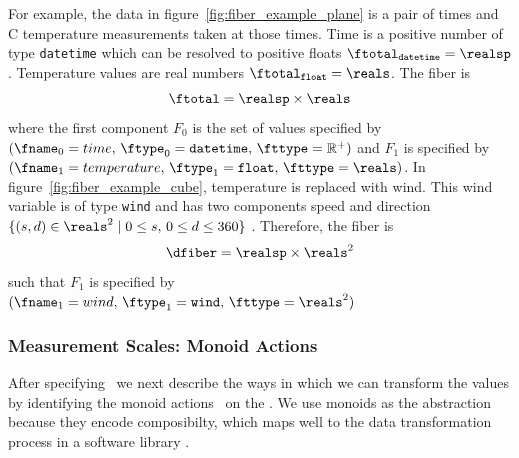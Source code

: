 \documentclass[../main.tex]{subfiles}
\begin{document}
For example, the data in figure~\ref{fig:fiber_example_plane} is a pair of times and \textdegree C temperature measurements taken at those times. Time is a positive number of type \texttt{datetime} which can be resolved to positive floats $\ftotal_{\texttt{datetime}}= \realsp$. Temperature values are real numbers $\ftotal_{\texttt{float}} = \reals$. The fiber is 
\begin{equation}
    \ftotal =  \realsp \times \reals 
\end{equation} 
where the first component $F_0$ is the set of values specified by $(\fname_0=time,\, \ftype_0=\texttt{datetime},\, \fttype=\mathbb{R}^+)$ and $F_1$ is specified by $(\fname_1=temperature,\, \ftype_1=\texttt{float},\, \fttype=\reals)$. In figure~\ref{fig:fiber_example_cube}, temperature is replaced with wind. This wind variable is of type \texttt{wind} and has two components speed and direction $\{(s,d) \in \reals^{2} \mid  0\leq s,\, 0 \leq d \leq 360\}$ . Therefore, the fiber is 
\begin{equation}
    \dfiber = \realsp \times \reals^{2}
\end{equation} 
such that $F_1$ is specified by $(\fname_1 = wind,\, \ftype_1=\texttt{wind},\, \fttype=\reals^{2})$  

\subsubsection{Measurement Scales: Monoid Actions}
\label{sec:data_monoid}
After specifying \dfiber\, we next describe the ways in which we can transform the values by identifying the monoid actions \monoid\ on the \dfiber. We use monoids as the abstraction because they encode composibilty, which maps well to the data transformation process in a software library \cite{yorgeyMonoidsThemeVariations}. 
\end{document}
